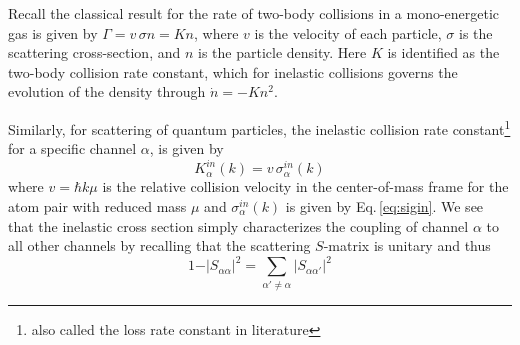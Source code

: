 Recall the classical result for the rate of two-body collisions in a mono-energetic gas is given by $\Gamma = v \,\sigma n = K n$, where $v$ is the velocity of each particle, $\sigma$ is the scattering cross-section, and $n$ is the particle density.
Here $K$ is identified as the two-body collision rate constant, which for inelastic collisions governs the evolution of the density through $\dot{n} = -K n^2$.

Similarly, for scattering of quantum particles, the inelastic collision rate constant\footnote{also called the loss rate constant in literature} for a specific channel $\alpha$, is given by \cite{Nicholson2015a}
\begin{equation} \label{eq:simpleK}
	K^{in}_{\alpha}(k) = v\,\sigma^{in}_{\alpha}(k)
\end{equation}
where $v=\hbar k \mu$ is the relative collision velocity in the center-of-mass frame for the atom pair with reduced mass $\mu$ and $\sigma^{in}_{\alpha}(k)$ is given by Eq.\,\ref{eq:sigin}.
We see that the inelastic cross section simply characterizes the coupling of channel $\alpha$ to all other channels by recalling that the scattering $S$-matrix is unitary and thus
\begin{equation}
	1 - \vert S_{\alpha \alpha} \vert^2 = \sum_{\alpha' \neq \alpha}\vert S_{\alpha \alpha'} \vert^2
\end{equation}


